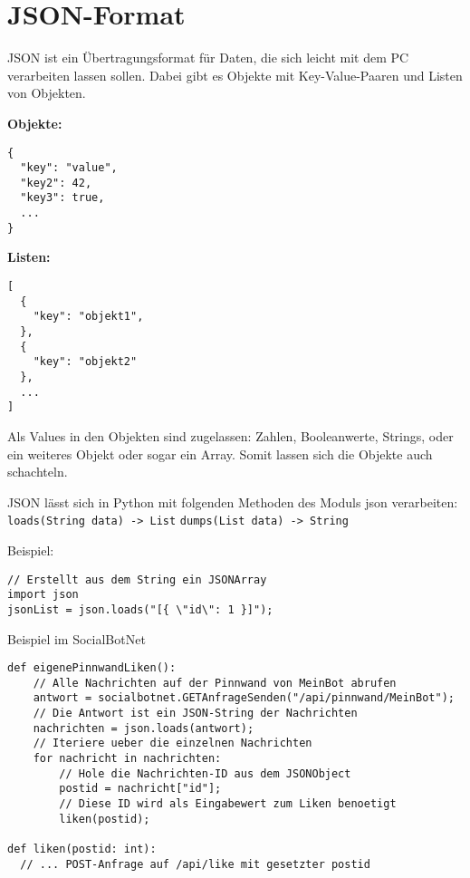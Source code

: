 \documentclass[parskip=half*]{scrartcl}
\begin{document}
\section*{JSON-Format}

JSON ist ein Übertragungsformat für Daten, die sich leicht mit dem PC verarbeiten lassen sollen. Dabei gibt es Objekte mit Key-Value-Paaren und Listen von Objekten.

\begin{minipage}[t]{0.45\linewidth}
\textbf{Objekte:}

\begin{lstlisting}[frame=single]
{
  "key": "value",
  "key2": 42,
  "key3": true,
  ...
}
\end{lstlisting}
\end{minipage}
\hspace{0.1\linewidth}
\begin{minipage}[t]{0.45\linewidth}
\textbf{Listen:}

\begin{lstlisting}[frame=single]
[
  {
    "key": "objekt1",
  },
  {
    "key": "objekt2"
  },
  ...
]
\end{lstlisting}
\end{minipage}
Als Values in den Objekten sind zugelassen: Zahlen, Booleanwerte, Strings, oder ein weiteres Objekt oder sogar ein Array. Somit lassen sich die Objekte auch schachteln.

JSON lässt sich in Python mit folgenden Methoden des Moduls json verarbeiten:
\newline
  \lstinline{loads(String data) -> List}
\newline
    \lstinline{dumps(List data) -> String}

Beispiel:

\begin{lstlisting}
// Erstellt aus dem String ein JSONArray
import json
jsonList = json.loads("[{ \"id\": 1 }]");

\end{lstlisting}

Beispiel im SocialBotNet
\begin{lstlisting}
def eigenePinnwandLiken():
    // Alle Nachrichten auf der Pinnwand von MeinBot abrufen
    antwort = socialbotnet.GETAnfrageSenden("/api/pinnwand/MeinBot");
    // Die Antwort ist ein JSON-String der Nachrichten
    nachrichten = json.loads(antwort);
    // Iteriere ueber die einzelnen Nachrichten
    for nachricht in nachrichten:
        // Hole die Nachrichten-ID aus dem JSONObject
        postid = nachricht["id"];
        // Diese ID wird als Eingabewert zum Liken benoetigt
        liken(postid);

def liken(postid: int):
  // ... POST-Anfrage auf /api/like mit gesetzter postid
  
\end{lstlisting}
\end{document}

